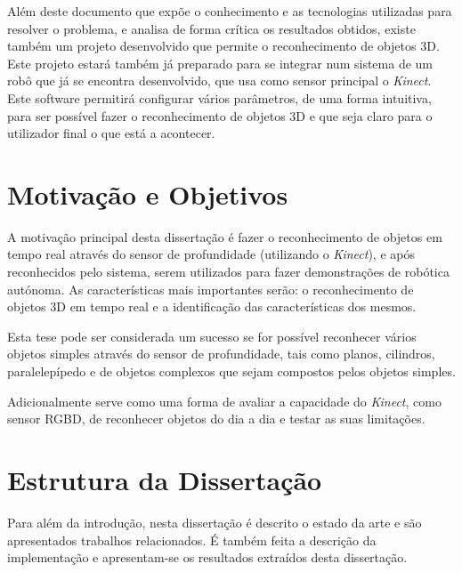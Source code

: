 Além deste documento que expõe o conhecimento e as tecnologias utilizadas para resolver o problema, e analisa de forma crítica os resultados obtidos, existe também um projeto desenvolvido que permite o reconhecimento de objetos 3D. Este projeto estará também já preparado para se integrar num sistema de um robô que já se encontra desenvolvido, que usa como sensor principal o \emph{Kinect}. Este software permitirá configurar vários parâmetros, de uma forma intuitiva, para ser possível fazer o reconhecimento de objetos 3D e que seja claro para o utilizador final o que está a acontecer.

\section{Motivação e Objetivos} \label{sec:goals}


A motivação principal desta dissertação é fazer o reconhecimento de objetos em tempo real através do sensor de profundidade (utilizando o \emph{Kinect}), e após reconhecidos pelo sistema, serem utilizados para fazer demonstrações de robótica autónoma. As características mais importantes serão: o reconhecimento de objetos 3D em tempo real e a identificação das características dos mesmos.

Esta tese pode ser considerada um sucesso se for possível  reconhecer vários objetos simples através do sensor de profundidade, tais como planos, cilindros, paralelepípedo e de objetos complexos que sejam compostos pelos objetos simples.

Adicionalmente serve como uma forma de avaliar a capacidade do \emph{Kinect}, como sensor RGBD, de reconhecer objetos do dia a dia e testar as suas limitações.


\section{Estrutura da Dissertação} \label{sec:struct}

Para além da introdução, nesta dissertação é descrito o estado da arte e são
apresentados trabalhos relacionados. É também feita a descrição da implementação e apresentam-se os resultados extraídos desta dissertação.

